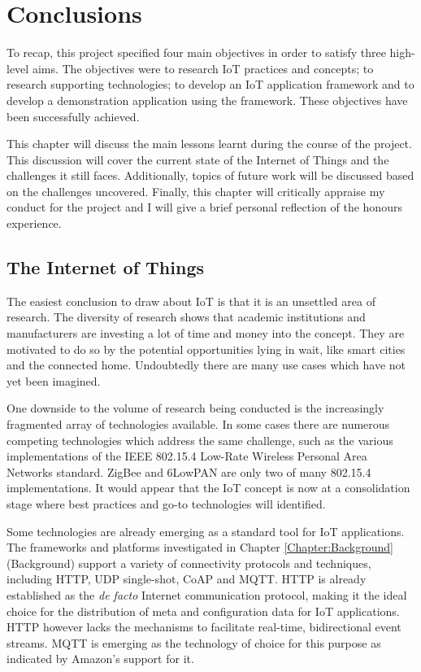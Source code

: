 \chapter{Conclusions}
  To recap, this project specified four main objectives in order to satisfy three high-level aims. The objectives were to research IoT practices and concepts; to research supporting technologies; to develop an IoT application framework and to develop a demonstration application using the framework. These objectives have been successfully achieved.

  This chapter will discuss the main lessons learnt during the course of the project. This discussion will cover the current state of the Internet of Things and the challenges it still faces. Additionally, topics of future work will be discussed based on the challenges uncovered. Finally, this chapter will critically appraise my conduct for the project and I will give a brief personal reflection of the honours experience.

  \section{The Internet of Things}
    The easiest conclusion to draw about IoT is that it is an unsettled area of research. The diversity of research shows that academic institutions and manufacturers are investing a lot of time and money into the concept. They are motivated to do so by the potential opportunities lying in wait, like smart cities and the connected home. Undoubtedly there are many use cases which have not yet been imagined.

    One downside to the volume of research being conducted is the increasingly fragmented array of technologies available. In some cases there are numerous competing technologies which address the same challenge, such as the various implementations of the IEEE 802.15.4 Low-Rate Wireless Personal Area Networks standard. ZigBee and 6LowPAN are only two of many 802.15.4 implementations. It would appear that the IoT concept is now at a consolidation stage where best practices and go-to technologies will identified.

    Some technologies are already emerging as a standard tool for IoT applications. The frameworks and platforms investigated in Chapter \ref{Chapter:Background} (Background) support a variety of connectivity protocols and techniques, including HTTP, UDP single-shot, CoAP and MQTT. HTTP is already established as the \textit{de facto} Internet communication protocol, making it the ideal choice for the distribution of meta and configuration data for IoT applications. HTTP however lacks the mechanisms to facilitate real-time, bidirectional event streams. MQTT is emerging as the technology of choice for this purpose as indicated by Amazon's support for it.

